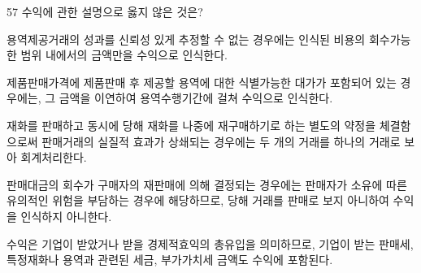 \begin{question}{57}
수익에 관한 설명으로 옳지 않은 것은?
\begin{choices}
  \item 용역제공거래의 성과를 신뢰성 있게 추정할 수 없는 경우에는 인식된 비용의 회수가능한 범위 내에서의 금액만을 수익으로 인식한다.
  \item 제품판매가격에 제품판매 후 제공할 용역에 대한 식별가능한 대가가 포함되어 있는 경우에는, 그 금액을 이연하여 용역수행기간에 걸쳐 수익으로 인식한다.
  \item 재화를 판매하고 동시에 당해 재화를 나중에 재구매하기로 하는 별도의 약정을 체결함으로써 판매거래의 실질적 효과가 상쇄되는 경우에는 두 개의 거래를 하나의 거래로 보아 회계처리한다.
  \item 판매대금의 회수가 구매자의 재판매에 의해 결정되는 경우에는 판매자가 소유에 따른 유의적인 위험을 부담하는 경우에 해당하므로, 당해 거래를 판매로 보지 아니하여 수익을 인식하지 아니한다.
  \item 수익은 기업이 받았거나 받을 경제적효익의 총유입을 의미하므로, 기업이 받는 판매세, 특정재화나 용역과 관련된 세금, 부가가치세 금액도 수익에 포함된다.
\end{choices}
\end{question}
